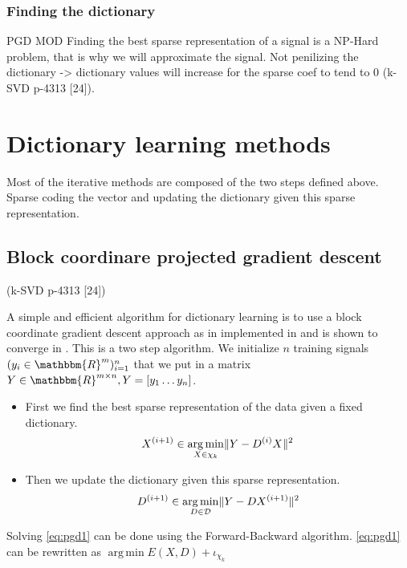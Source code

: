 \documentclass[a4paper,11pt]{article}
\newcommand{\RR}{\mathbbm{R}} %
\DeclarePairedDelimiter\norm{\lVert}{\rVert} %
\DeclareMathOperator*{\argmin}{arg\,min} %
\begin{document}
\subsubsection{Finding the dictionary}
PGD MOD
Finding the best sparse representation of a signal is a NP-Hard problem, that is why we will approximate the signal.
Not penilizing the dictionary -> dictionary values will increase for the sparse coef to tend to 0
\cite{olshausen97} (k-SVD p-4313 [24]).
\section{Dictionary learning methods}
Most of the iterative methods are composed of the two steps defined above.
Sparse coding the vector and updating the dictionary given this sparse representation.


\subsection{Block coordinare projected gradient descent}
\cite{olshausen97} (k-SVD p-4313 [24])

A simple and efficient algorithm for dictionary learning is to use a block coordinate gradient descent approach as in implemented in \cite{nt4} and is shown to converge in \cite{tseng01}.
This is a two step algorithm.
We initialize $n$ training signals $(y_i \in \RR^m)_{i=1}^{n}$
that we put in a matrix $Y \in \RR^{m \times n}, Y = [y_1 \ldots y_n]$.
\begin{itemize}
  \item First we find the best sparse representation of the data given a fixed dictionary.
  	\begin{equation} \label{eq:pgd1}
      X^{(i+1)} \in \argmin_{X \in \chi_k} \norm{Y - D^{(i)}X}^2
	\end{equation}
  \item Then we update the dictionary given this sparse representation.
  	\begin{equation} \label{eq:pgd2}
      D^{(i+1)} \in \argmin_{D \in \mathcal{D}} \norm{Y - DX^{(i+1)}}^2
	\end{equation}
\end{itemize}
Solving \ref{eq:pgd1} can be done using the Forward-Backward algorithm.
\ref{eq:pgd1} can be rewritten as $\argmin E(X,D) + \iota_{\chi_k}$
\end{document}
